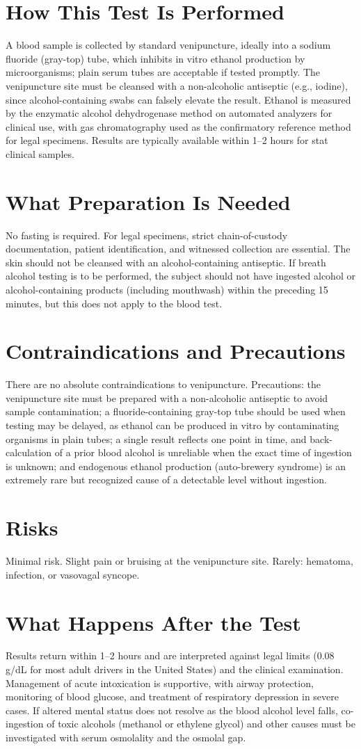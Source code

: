 \section*{How This Test Is Performed}
A blood sample is collected by standard venipuncture, ideally into a sodium fluoride (gray-top) tube, which inhibits in vitro ethanol production by microorganisms; plain serum tubes are acceptable if tested promptly. The venipuncture site must be cleansed with a non-alcoholic antiseptic (e.g., iodine), since alcohol-containing swabs can falsely elevate the result. Ethanol is measured by the enzymatic alcohol dehydrogenase method on automated analyzers for clinical use, with gas chromatography used as the confirmatory reference method for legal specimens. Results are typically available within 1--2 hours for stat clinical samples.
\section*{What Preparation Is Needed}
No fasting is required. For legal specimens, strict chain-of-custody documentation, patient identification, and witnessed collection are essential. The skin should not be cleansed with an alcohol-containing antiseptic. If breath alcohol testing is to be performed, the subject should not have ingested alcohol or alcohol-containing products (including mouthwash) within the preceding 15 minutes, but this does not apply to the blood test.
\section*{Contraindications and Precautions}
There are no absolute contraindications to venipuncture. Precautions: the venipuncture site must be prepared with a non-alcoholic antiseptic to avoid sample contamination; a fluoride-containing gray-top tube should be used when testing may be delayed, as ethanol can be produced in vitro by contaminating organisms in plain tubes; a single result reflects one point in time, and back-calculation of a prior blood alcohol is unreliable when the exact time of ingestion is unknown; and endogenous ethanol production (auto-brewery syndrome) is an extremely rare but recognized cause of a detectable level without ingestion.
\section*{Risks}
Minimal risk. Slight pain or bruising at the venipuncture site. Rarely: hematoma, infection, or vasovagal syncope.
\section*{What Happens After the Test}
Results return within 1--2 hours and are interpreted against legal limits (0.08 g/dL for most adult drivers in the United States) and the clinical examination. Management of acute intoxication is supportive, with airway protection, monitoring of blood glucose, and treatment of respiratory depression in severe cases. If altered mental status does not resolve as the blood alcohol level falls, co-ingestion of toxic alcohols (methanol or ethylene glycol) and other causes must be investigated with serum osmolality and the osmolal gap.
